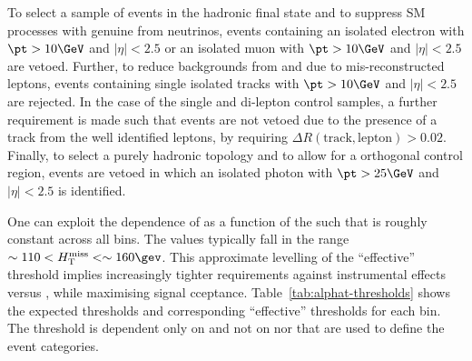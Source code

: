 To select a sample of events in the hadronic final state and to suppress SM processes with genuine \met from neutrinos, events
containing an isolated electron with $\pt > 10\GeV$ and $|\eta| < 2.5$ or an isolated muon with $\pt > 10\GeV$ and $|\eta| < 2.5$ are
vetoed. Further, to reduce backgrounds from \wj and \ttbar due to mis-reconstructed leptons, events containing single isolated tracks with $\pt > 10\GeV$ and $|\eta| < 2.5$ are rejected. In the case of the single and di-lepton control samples, a further
requirement is made such that events are not vetoed due to the presence of a track from the well identified leptons, by requiring
$\Delta R(\textrm{track},\textrm{lepton}) > 0.02$. Finally, to select a purely hadronic topology and to allow for a 
orthogonal control region, events are vetoed in which an isolated photon with $\pt > 25\GeV$ and $|\eta| < 2.5$ is identified.



One can exploit the dependence of  \alphat as a function of the \HT such that \mht is roughly constant across all \HT bins. 
The values typically fall in the range $\sim110 < \mht < \sim160\gev$. This approximate levelling of the ``effective'' \mht threshold implies
increasingly tighter requirements against instrumental effects versus \HT, while maximising signal cceptance. 
Table~\ref{tab:alphat-thresholds} shows the expected \alphat thresholds and corresponding ``effective'' \mht thresholds for each \HT bin. 
The \alphat threshold is dependent only on \HT and not on \njet nor \nb that are used to define the event categories.



